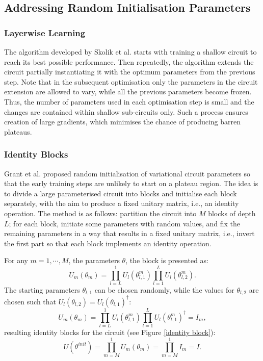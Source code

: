\subsection{Addressing Random Initialisation Parameters}

\subsubsection{Layerwise Learning}
The algorithm developed by Skolik et al. \cite{skolikLayerwiseLearningQuantum2021} starts with training a shallow circuit to reach its best possible performance. Then repeatedly, the algorithm extends the circuit partially instantiating it with the optimum parameters from the previous step.
Note that in the subsequent optimisation only the parameters in the circuit extension are allowed to vary, while all the previous parameters become frozen.
Thus, the number of parameters used in each optimisation step is small and the changes are contained within shallow sub-circuits only. Such a process ensures creation of large gradients, which minimises the chance of producing barren plateaus.


\subsubsection{Identity Blocks} \label{Sec: Identity blocks}

Grant et al. \cite{grantInitializationStrategyAddressing2019} proposed random initialisation of variational circuit parameters so that the early training steps are unlikely to start on a plateau region.
The idea is to divide a large parameterised circuit into blocks and initialise each block separately, with the aim to produce a fixed unitary matrix, i.e., an identity operation.
The method is as follows: partition the circuit into $M$ blocks of depth $L$; for each block, initiate some parameters with random values, and fix the remaining parameters in a way that results in a fixed unitary matrix, i.e., invert the first part so that each block implements an identity operation.

For any $m = 1, \cdots, M$, the parameters $\theta$, the block is presented as:
\begin{equation}
    U_m(\theta_m)
    = \prod_{l=L}^1 U_l(\theta_{l,1}^m) \prod_{l=1}^L U_l(\theta_{l,2}^m).
\end{equation}
The starting parameters $\theta_{l,1}$ can be chosen randomly, while the values for $\theta_{l,2}$ are chosen such that $U_l(\theta_{l,2}) = U_l(\theta_{l,1})^\dagger$:
\begin{equation}
    U_m(\theta_m)
    = \prod_{l=L}^1 U_l(\theta_{l,1}^m)
    \prod_{l=1}^L U_l(\theta_{l,1}^m)^\dagger
    = I_m,
\end{equation}
resulting identity blocks for the circuit (see Figure \ref{identity block}):
\begin{equation}
    U(\theta^{init})
    = \prod_{m=M}^1 U_m(\theta_m)
    = \prod_{m=M}^1 I_m
    = I.
\end{equation}

